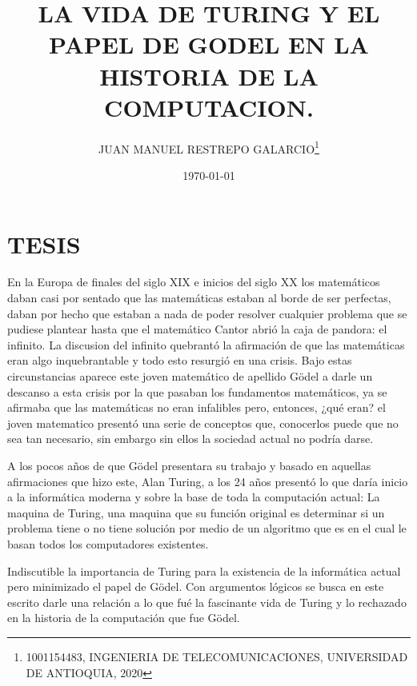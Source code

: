 \documentclass[12pt,letterpaper]{article}
\author{JUAN MANUEL RESTREPO GALARCIO\thanks{1001154483, INGENIERIA DE TELECOMUNICACIONES, UNIVERSIDAD DE ANTIOQUIA, 2020}}
\title{LA VIDA DE TURING Y EL PAPEL DE GODEL EN LA HISTORIA DE LA COMPUTACION.}
\date{\today}
\begin{document}
\maketitle





\section{TESIS}

En la Europa de finales del siglo XIX e inicios del siglo XX  los matemáticos daban casi por sentado que las matemáticas estaban al borde de ser perfectas, daban por hecho que estaban a nada de poder resolver cualquier problema que se pudiese plantear hasta que el matemático Cantor abrió la caja de pandora: el infinito.
La discusion del infinito quebrantó la afirmación de que las matemáticas eran algo inquebrantable y todo esto resurgió en una crisis. Bajo estas circunstancias  aparece este joven matemático de apellido Gödel a darle un descanso a esta crisis por la que pasaban los fundamentos matemáticos, ya se afirmaba que las matemáticas no eran infalibles pero, entonces, ¿qué eran? el joven matematico presentó una serie de conceptos que, conocerlos puede que no sea tan necesario, sin embargo sin ellos la sociedad actual no podría darse. \cite{rodriguez2012alan}

A los pocos años de que Gödel presentara su trabajo y basado en aquellas afirmaciones que hizo este,  Alan Turing, a los 24 años presentó lo que daría inicio a la informática moderna y sobre la base de toda la computación actual: La maquina de Turing, una maquina que su función original es determinar si un problema tiene o no tiene solución por medio de un algoritmo que es en el cual le basan todos los computadores existentes. \cite{chaitin2003ordenadores}

Indiscutible la importancia de Turing para la existencia de la informática actual pero minimizado el papel de Gödel. Con argumentos lógicos se busca en este escrito darle una relación a lo que fué la fascinante vida de Turing y lo rechazado en la historia de la computación que fue Gödel.
\end{document}
